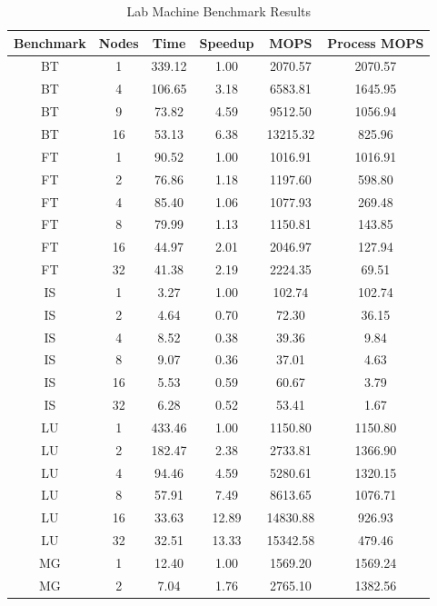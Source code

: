 \documentclass{acm_proc_article-sp}
\begin{document}
\begin{table}[tbp]
\centering
\caption{Lab Machine Benchmark Results}
\label{LabTable}
\begin{tabular}{ c | c || c | c | c | c }
	Benchmark & Nodes & Time & Speedup & MOPS & Process MOPS\\ \hline
    BT    & 1     & 339.12 & 1.00  & 2070.57 & 2070.57 \\
    BT    & 4     & 106.65 & 3.18  & 6583.81 & 1645.95 \\
    BT    & 9     & 73.82 & 4.59  & 9512.50 & 1056.94 \\
    BT    & 16    & 53.13 & 6.38  & 13215.32 & 825.96 \\
    FT    & 1     & 90.52 & 1.00  & 1016.91 & 1016.91 \\
    FT    & 2     & 76.86 & 1.18  & 1197.60 & 598.80 \\
    FT    & 4     & 85.40  & 1.06  & 1077.93 & 269.48 \\
    FT    & 8     & 79.99 & 1.13  & 1150.81 & 143.85 \\
    FT    & 16    & 44.97 & 2.01  & 2046.97 & 127.94 \\
    FT    & 32    & 41.38 & 2.19  & 2224.35 & 69.51 \\
    IS    & 1     & 3.27  & 1.00  & 102.74 & 102.74 \\
    IS    & 2     & 4.64  & 0.70  & 72.30  & 36.15 \\
    IS    & 4     & 8.52  & 0.38  & 39.36 & 9.84 \\
    IS    & 8     & 9.07  & 0.36  & 37.01 & 4.63 \\
    IS    & 16    & 5.53  & 0.59  & 60.67 & 3.79 \\
    IS    & 32    & 6.28  & 0.52  & 53.41 & 1.67 \\
    LU    & 1     & 433.46 & 1.00  & 1150.80 & 1150.80 \\
    LU    & 2     & 182.47 & 2.38  & 2733.81 & 1366.90 \\
    LU    & 4     & 94.46 & 4.59  & 5280.61 & 1320.15 \\
    LU    & 8     & 57.91 & 7.49  & 8613.65 & 1076.71 \\
    LU    & 16    & 33.63 & 12.89 & 14830.88 & 926.93 \\
    LU    & 32    & 32.51 & 13.33 & 15342.58 & 479.46 \\
    MG    & 1     & 12.40  & 1.00     & 1569.20 & 1569.24 \\
    MG    & 2     & 7.04  & 1.76  & 2765.10 & 1382.56 \\

\end{tabular}
\end{table}
\end{document}
